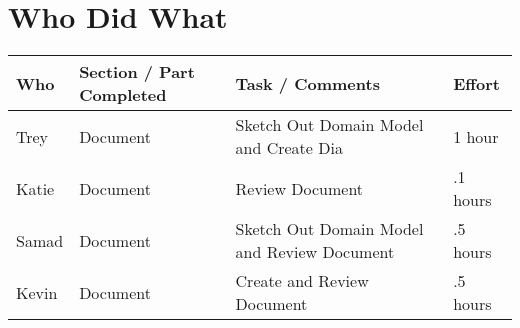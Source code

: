 \clearpage
\section{Who Did What}
\begin{table}[!h]
    \begin{tabular}{|p{2.5cm}|p{4.5cm}|p{4.5cm}|p{2.5cm}|}
   	\hline
	 Who   & Section / Part Completed & Task / Comments & Effort \\
	 \hline
	  Trey  & Document & Sketch Out Domain Model and Create Dia & 1 hour \\
   	 \hline
	 Katie & Document & Review Document & .1 hours \\
 	 \hline
	 Samad & Document & Sketch Out Domain Model and Review Document & .5 hours \\
 	 \hline
	 Kevin & Document & Create and Review Document & .5 hours \\
 	 \hline
    \end{tabular}
\end{table}
